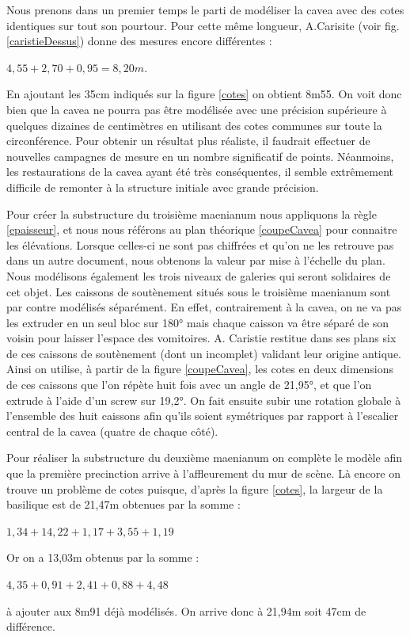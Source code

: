 Nous prenons dans un premier temps le parti de modéliser la  \gls{cavea} avec des cotes identiques sur tout son pourtour. Pour cette même longueur, A.Carisite (voir fig. \ref{caristieDessus}) donne des mesures encore différentes : 
\begin{center}
$4,55+2,70+0,95=8,20m$.
\end{center}
En ajoutant les 35cm indiqués sur la figure \ref{cotes} on obtient 8m55. On voit donc bien que la \gls{cavea} ne pourra pas être modélisée avec une précision supérieure à quelques dizaines de centimètres en utilisant des cotes communes sur toute la circonférence. Pour obtenir un résultat plus réaliste, il faudrait effectuer de nouvelles campagnes de mesure en un nombre significatif de points. Néanmoins, les restaurations de la \gls{cavea} ayant été très conséquentes, il semble extrêmement difficile de remonter à la structure initiale avec grande précision.

Pour créer la substructure du troisième \gls{maenianum} nous appliquons la règle \ref{epaisseur}, et nous nous référons au plan théorique \ref{coupeCavea} pour connaitre les élévations. Lorsque celles-ci ne sont pas chiffrées et qu'on ne les retrouve pas dans un autre document, nous obtenons la valeur par mise à l'échelle du plan. Nous modélisons également les trois niveaux de galeries qui seront solidaires de cet objet. Les caissons de soutènement situés sous le troisième \gls{maenianum} sont par contre modélisés séparément. En effet, contrairement à la \gls{cavea}, on ne va pas les extruder en un seul bloc sur 180° mais chaque caisson va être séparé de son voisin pour laisser l'espace des vomitoires. A. Caristie restitue dans ses plans six de ces caissons de soutènement (dont un incomplet) validant leur origine antique. Ainsi on utilise, à partir de la figure \ref{coupeCavea}, les cotes en deux dimensions de ces caissons que l'on répète huit fois avec un angle de 21,95°, et que l'on extrude à l'aide d'un \gls{screw} sur 19,2°. On fait ensuite subir une rotation globale à l'ensemble des huit caissons afin qu'ils soient symétriques par rapport à l'escalier central de la \gls{cavea} (quatre de chaque côté). 

Pour réaliser la substructure du deuxième \gls{maenianum} on complète le modèle afin que la première \gls{precinction} arrive à l'affleurement du mur de scène. Là encore on trouve un problème de cotes puisque, d'après la figure \ref{cotes}, la largeur de la basilique est de 21,47m obtenues par la somme :
\begin{center}
$1,34+14,22+1,17+3,55+1,19$
\end{center}
Or on a 13,03m obtenus par la somme : 
\begin{center}
$4,35+0,91+2,41+0,88+4,48$
\end{center}
à ajouter aux 8m91 déjà modélisés. On arrive donc à 21,94m soit 47cm de différence. 


